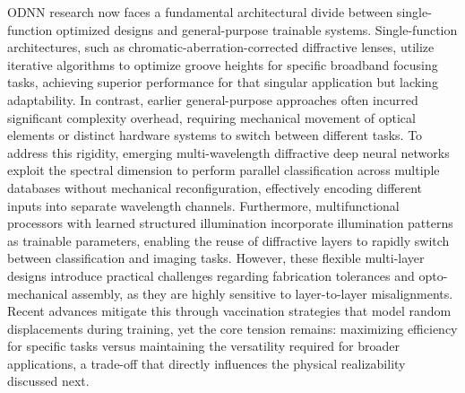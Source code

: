 ODNN research now faces a fundamental architectural divide between single-function optimized designs and general-purpose trainable systems. Single-function architectures, such as chromatic-aberration-corrected diffractive lenses, utilize iterative algorithms to optimize groove heights for specific broadband focusing tasks, achieving superior performance for that singular application but lacking adaptability. In contrast, earlier general-purpose approaches often incurred significant complexity overhead, requiring mechanical movement of optical elements or distinct hardware systems to switch between different tasks. To address this rigidity, emerging multi-wavelength diffractive deep neural networks exploit the spectral dimension to perform parallel classification across multiple databases without mechanical reconfiguration, effectively encoding different inputs into separate wavelength channels. Furthermore, multifunctional processors with learned structured illumination incorporate illumination patterns as trainable parameters, enabling the reuse of diffractive layers to rapidly switch between classification and imaging tasks. However, these flexible multi-layer designs introduce practical challenges regarding fabrication tolerances and opto-mechanical assembly, as they are highly sensitive to layer-to-layer misalignments. Recent advances mitigate this through vaccination strategies that model random displacements during training, yet the core tension remains: maximizing efficiency for specific tasks versus maintaining the versatility required for broader applications, a trade-off that directly influences the physical realizability discussed next. \citep{doi_10_1038_srep21545_ae20cc7d} \citep{doi_10_1515_nanoph_2022_0615_9a3be8d6} \citep{doi_10_1364_ol_591818_8738c4b1} \citep{doi_10_1515_nanoph_2020_0291_c4a9f42d}

